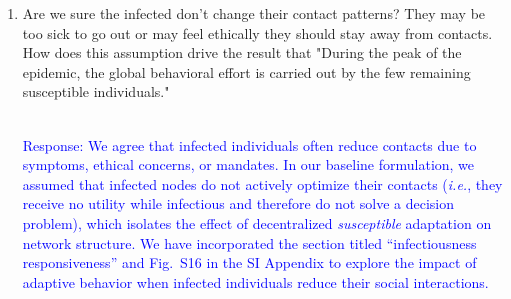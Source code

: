 \documentclass{article}
\newcommand{\blue}[1]{{\textcolor{blue}{#1}}}
\newcommand{\red}[1]{{\textcolor{red}{#1}}}
\begin{document}
\begin{enumerate}

    \item Are we sure the infected don't change their contact patterns? They may be too sick to go out or may feel ethically they should stay away from contacts. How does this assumption drive the result that "During the peak of the epidemic, the global behavioral effort is carried out by the few remaining susceptible individuals."
    
    \blue{\\Response:
    We agree that infected individuals often reduce contacts due to symptoms, ethical concerns, or mandates. In our baseline formulation, we assumed that infected nodes do not actively optimize their contacts ({\it i.e.}, they receive no utility while infectious and therefore do not solve a decision problem), which isolates the effect of decentralized \emph{susceptible} adaptation on network structure.
    We have incorporated the section titled ``infectiousness responsiveness'' and Fig.~S16 in the SI Appendix to explore the impact of adaptive behavior when infected individuals reduce their social interactions.
    }


\end{enumerate}
\end{document}
